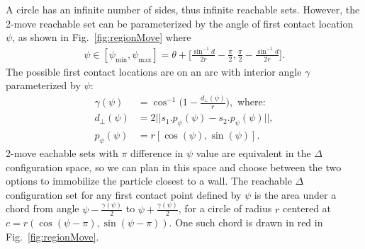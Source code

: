  


%

A circle has an infinite number of sides, thus infinite reachable sets. However, the 2-move reachable set can be parameterized by the angle of first contact location $\psi$, as shown in Fig.~\ref{fig:regionMove} where 
\begin{align}
 \psi \in [\psi_{\min}, \psi_{\max}]= \theta + \Big[\frac{\sin^{-1}{d}}{2r} - \frac{\pi}{2},  \frac{\pi}{2} -\frac{\sin^{-1}{d}}{2r} \Big].
\end{align}
The possible first contact locations are on an arc with interior angle $\gamma$ parameterized by $\psi$:
\begin{align}\label{eq:gamma}
\gamma(\psi) &= \cos^{-1} \Big(1-\frac{d_\perp(\psi)}{r} \Big), \textrm{ where:}\\ \label{eq:dprep}
d_\perp(\psi)&= 2 ||s_1.p_\psi(\psi) - s_2.p_\psi(\psi)||,\\ \label{eq:ppsi}
p_\psi(\psi) &= r[\cos(\psi ), \sin(\psi )].
\end{align} 
2-move eachable sets with $\pi$ difference in $\psi$ value are equivalent in the  $\Delta$ configuration space, so we can plan in this space and choose between the two options to immobilize the particle closest to a wall. 
The reachable $\Delta$ configuration set for any first contact point defined by $\psi$ is the area under a chord from angle $\psi- \frac{\gamma(\psi)}{2}$ to $\psi+ \frac{\gamma(\psi)}{2}$, for a circle of radius $r$ centered at $c = r(\cos(\psi-\pi), \sin(\psi-\pi))$. One such chord is drawn in red in Fig.~\ref{fig:regionMove}.

